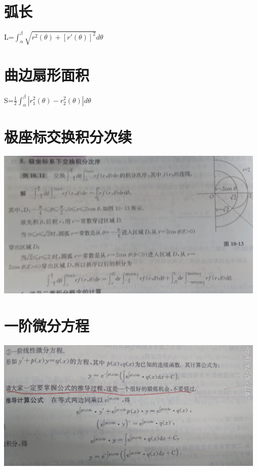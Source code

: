 \documentclass[UTF8]{ctexart}
\begin{document}
\section{弧长}
L=$ \int_α^β \sqrt{r^2(θ)+[r'(θ)]^2}dθ$
\section{曲边扇形面积}
 S=$ \frac{1}{2} \int_α^β|r_1^2(θ)-r_2^2(θ)|dθ$

\section{极座标交换积分次续}
\includegraphics[width=13cm]{9345E7/3720754172.jpg}

\section{一阶微分方程}
\includegraphics[width=13cm]{9345E7/677562795.jpg}
\end{document}
